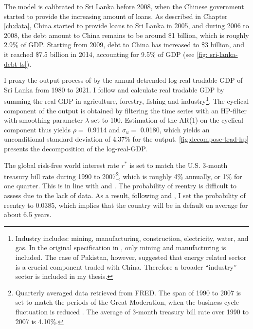 The model is calibrated to Sri Lanka before 2008, when the Chinese government started to provide the increasing amount of loans.
As described in Chapter \ref{ch:data}, China started to provide loans to Sri Lanka in 2005, and during 2006 to 2008, the debt amount to China remains to be around \$1 billion, which is roughly 2.9\% of GDP. Starting from 2009, debt to China has increased to \$3 billion, and it reached \$7.5 billion in 2014, accounting for 9.5\% of GDP
(see \autoref{fig: sri-lanka-debt-ts}).

I proxy the output process of  by the annual detrended log-real-tradable-GDP of Sri Lanka from 1980 to 2021. I follow \citet{Na-18} and calculate real tradable GDP by summing the real GDP in agriculture, forestry, fishing and industry\footnote{
    Industry includes: mining, manufacturing, construction, electricity, water, and gas. In the original specification in \citet{Na-18}, only mining and manufacturing is included. The case of Pakistan, however, suggested that energy related sector is a crucial component traded with China. Therefore a broader ``industry'' sector is included in my thesis.
}. The cyclical component of the output is obtained by filtering the time series with an HP-filter with smoothing parameter $\lambda$ set to 100.
Estimation of the AR(1) on the cyclical component thus yields $\rho = $ 0.9114 and $\sigma_u = $ 0.0180, which yields an unconditional standard deviation of 4.37\% for the output\footnotemark{}. \autoref{fig:decompose-trad-hp} presents the decomposition of the log-real-GDP.

The global risk-free world interest rate $r^*$ is set to match the U.S. 3-month treasury bill rate during 1990 to 2007\footnote{
    Quarterly averaged data retrieved from FRED. The span of 1990 to 2007 is set to match the periods of the Great Moderation, when the business cycle fluctuation is reduced \citep{FedHistory-GreatModeration}. The average of 3-month treasury bill rate over 1990 to 2007 is 4.10\%.
}, which is roughly 4\% annually, or 1\% for one quarter. This is in line with \citet{Chatterjee-12} and \citet{Na-18}.
The probability of reentry is difficult to assess due to the lack of data. As a result, following \citet*{Chatterjee-12} and \citet*{Hinrichsen_2020-chapter4}, I set the probability of reentry to 0.0385, which implies that the country will be in default on average for about 6.5 years.

